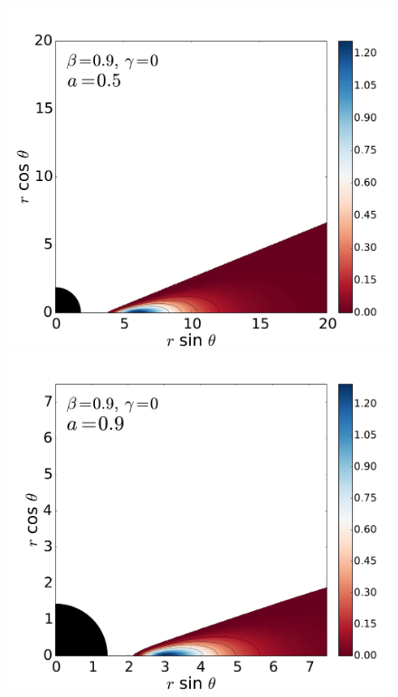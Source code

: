 \documentclass{aa}
\begin{document}
\begin{figure}
\includegraphics[scale=0.14]{figures/fig2_5_1.pdf}
\hspace{-0.3cm}
\includegraphics[scale=0.14]{figures/fig2_5_2.pdf}
\hspace{-0.2cm}

\end{figure}
\end{document}
